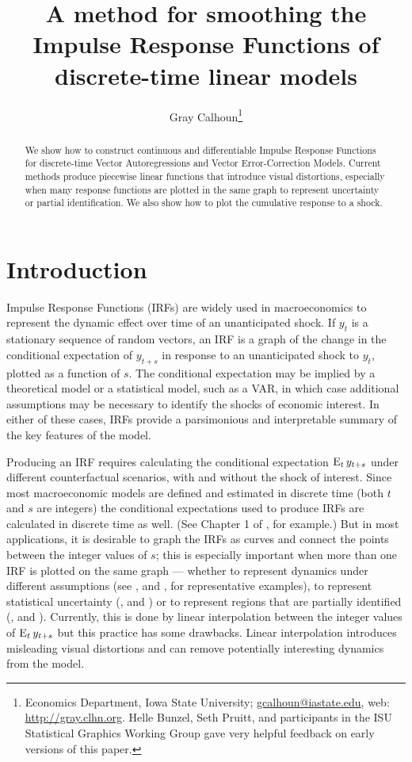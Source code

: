 \documentclass[12pt,fleqn]{article}
\title{A method for smoothing the Impulse Response Functions of
  discrete-time linear models}
\author{Gray Calhoun\thanks{%
    Economics Department, Iowa State University;
    \protect\url{gcalhoun@iastate.edu},
    web: \protect\url{http://gray.clhn.org}.
    Helle Bunzel, Seth Pruitt, and participants in the ISU Statistical
    Graphics Working Group gave very helpful feedback on early
    versions of this paper.}}
\begin{document}
\maketitle
\begin{abstract}\noindent%
  We show how to construct continuous and differentiable Impulse
  Response Functions for discrete-time Vector Autoregressions and
  Vector Error-Correction Models. Current methods produce piecewise
  linear functions that introduce visual distortions, especially when
  many response functions are plotted in the same graph to represent
  uncertainty or partial identification. We also show how to plot the
  cumulative response to a shock.
\end{abstract}

\tableofcontents
\newpage

\section{Introduction}
\label{S1}

Impulse Response Functions (IRFs) are widely used in macroeconomics
to represent the dynamic effect over time of an unanticipated
shock. If $y_t$ is a stationary sequence of random vectors, an IRF
is a graph of the change in the conditional expectation of $y_{t+s}$
in response to an unanticipated shock to $y_t$, plotted as a function
of $s$. The conditional expectation may be implied by a theoretical
model or a statistical model, such as a VAR, in which case additional
assumptions may be necessary to identify the shocks of economic
interest. In either of these cases, IRFs provide a parsimonious and
interpretable summary of the key features of the model.

Producing an IRF requires calculating the conditional expectation
$\operatorname{E}_t y_{t+s}$ under different counterfactual scenarios, with and
without the shock of interest. Since most macroeconomic models are
defined and estimated in discrete time (both $t$ and $s$ are integers)
the conditional expectations used to produce IRFs are calculated in
discrete time as well. (See Chapter 1 of \citealp{Ham:94}, for
example.) But in most applications, it is desirable to graph the IRFs
as curves and connect the points between the integer values of $s$;
this is especially important when more than one IRF is plotted on
the same graph --- whether to represent dynamics under different
assumptions (see \citealp{BeM:98}, and \citealp{StW:01}, for
representative examples), to represent statistical uncertainty
(\citealp{Kil:98}, and \citealp{SiZ:99}) or to represent regions that
are partially identified (\citealp{Uhl:05}, and
\citealp{InK:13}). Currently, this is done by linear interpolation
between the integer values of $\operatorname{E}_t y_{t+s}$ but this practice has
some drawbacks. Linear interpolation introduces misleading visual
distortions and can remove potentially interesting dynamics from the
model.
\end{document}
